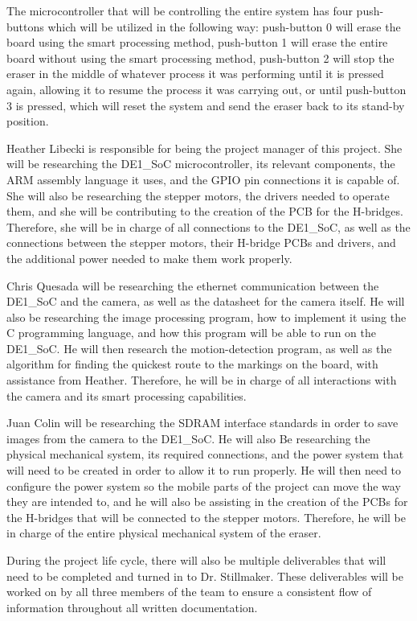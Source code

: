 \setlength{\parindent}{2.5ex} The microcontroller that will be controlling the entire system has four push-buttons which will be utilized in the following way: push-button 0 will erase the board using the smart processing method, push-button 1 will erase the entire board without using the smart processing method, push-button 2 will stop the eraser in the middle of whatever process it was performing until it is pressed again, allowing it to resume the process it was carrying out, or until push-button 3 is pressed, which will reset the system and send the eraser back to its stand-by position. \par
\setlength{\parindent}{2.5ex} Heather Libecki is responsible for being the project manager of this project. She will be researching the DE1\_SoC microcontroller, its relevant components, the ARM assembly language it uses, and the GPIO pin connections it is capable of. She will also be researching the stepper motors, the drivers needed to operate them, and she will be contributing to the creation of the PCB for the H-bridges. Therefore, she will be in charge of all connections to the DE1\_SoC, as well as the connections between the stepper motors, their H-bridge PCBs and drivers, and the additional power needed to make them work properly. \par
\setlength{\parindent}{2.5ex} Chris Quesada will be researching the ethernet communication between the DE1\_SoC and the camera, as well as the datasheet for the camera itself. He will also be researching the image processing program, how to implement it using the C programming language, and how this program will be able to run on the DE1\_SoC. He will then research the motion-detection program, as well as the algorithm for finding the quickest route to the markings on the board, with assistance from Heather. Therefore, he will be in charge of all interactions with the camera and its smart processing capabilities. \par
\setlength{\parindent}{2.5ex} Juan Colin will be researching the SDRAM interface standards in order to save images from the camera to the DE1\_SoC. He will also Be researching the physical mechanical system, its required connections, and the power system that will need to be created in order to allow it to run properly. He will then need to configure the power system so the mobile parts of the project can move the way they are intended to, and he will also be assisting in the creation of the PCBs for the H-bridges that will be connected to the stepper motors. Therefore, he will be in charge of the entire physical mechanical system of the eraser. \par
\setlength{\parindent}{2.5ex} During the project life cycle, there will also be multiple deliverables that will need to be completed and turned in to Dr. Stillmaker. These deliverables will be worked on by all three members of the team to ensure a consistent flow of information throughout all written documentation.
 
